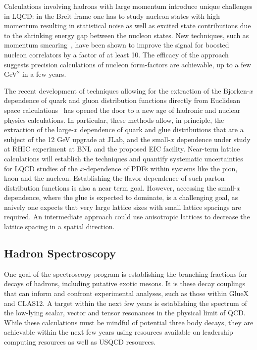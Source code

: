 Calculations involving hadrons with large momentum introduce unique challenges in LQCD: in the Breit frame one 
has to study nucleon states with high momentum 
resulting in statistical noise as well as excited state contributions due to the
shrinking energy gap between the nucleon states.
New techniques, such as momentum smearing~\cite{Bali:2016lva,Syritsyn:2017jrc}, have been shown to improve
the signal for boosted nucleon correlators by a factor of at least 10. The efficacy of the approach suggests precision calculations of nucleon form-factors are achievable, up to a few GeV$^2$ in a few years.


The recent development of techniques allowing for the extraction of the Bjorken-$x$ dependence of quark and gluon distribution functions directly from Euclidean space calculations~\cite{Ji:2001wha} has opened the door to a new age of hadronic and nuclear physics calculations. In particular, these methods allow, in principle,  the extraction of the large-$x$ dependence of quark and glue distributions that are a subject of the 12 GeV upgrade at JLab, and the small-$x$ dependence under study at RHIC experiment at BNL and the proposed EIC facility. Near-term  lattice calculations will establish the techniques and quantify systematic uncertainties for LQCD studies of the $x$-dependence of PDFs within systems like the pion, kaon and the nucleon. Establishing the flavor dependence of such parton distribution functions is also a near term goal. However, accessing the small-$x$ dependence, where the glue is expected to dominate, is a challenging goal, as naively one expects that very large lattice sizes with small lattice spacings are required. An intermediate approach could use anisotropic lattices to decrease the lattice spacing in a spatial direction.%



\subsection{Hadron Spectroscopy}

One goal of the spectroscopy program is establishing the branching fractions for decays of hadrons, including putative exotic mesons. It is these decay couplings that can inform and confront experimental analyses, such as those within GlueX and CLAS12. A target within the next few years is establishing the spectrum of the low-lying scalar, vector and tensor resonances in the physical limit of QCD. While these calculations must be mindful of potential three body decays, they are achievable within the next few years using resources available on leadership computing resources as well as USQCD resources.

